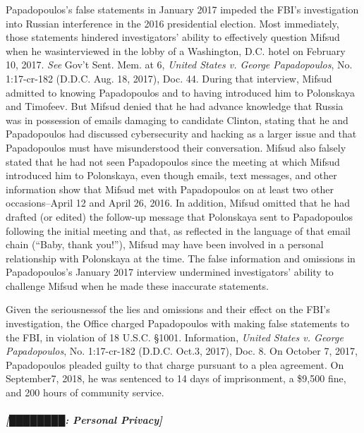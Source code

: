 Papadopoulos's false statements in January 2017 impeded the FBI's investigation into Russian interference in the 2016 presidential election. 
Most immediately, those statements hindered investigators' ability to effectively question Mifsud when he wasinterviewed in the lobby of a Washington, D.C. hotel on February 10, 2017. 
\textit{See} Gov't Sent. Mem. at 6, \textit{United States v. George Papadopoulos}, No. 1:17-cr-182 (D.D.C. Aug. 18, 2017), Doc. 44. 
During that interview, Mifsud admitted to knowing Papadopoulos and to having introduced him to Polonskaya and Timofeev. 
But Mifsud denied that he had advance knowledge that Russia was in possession of emails damaging to candidate Clinton, stating that he and Papadopoulos had discussed cybersecurity and hacking as a larger issue and that Papadopoulos must have misunderstood their conversation. 
Mifsud also falsely stated that he had not seen Papadopoulos since the meeting at which Mifsud introduced him to Polonskaya, even though emails, text messages, and other information show that Mifsud met with Papadopoulos on at least two other occasions--April 12 and April 26, 2016. 
In addition, Mifsud omitted that he had drafted (or edited) the follow-up message that Polonskaya sent to Papadopoulos following the initial meeting and that, as reflected in the language of that email chain (``Baby, thank you!''), Mifsud may have been involved in a personal relationship with Polonskaya at the time. 
The false information and omissions in Papadopoulos's January 2017 interview undermined investigators' ability to challenge Mifsud when he made these inaccurate statements.

Given the seriousnessof the lies and omissions and their effect on the FBI's investigation, the Office charged Papadopoulos with making false statements to the FBI, in violation of 18 U.S.C. \S 1001. 
Information, \textit{United States v. George Papadopoulos}, No. 1:17-cr-182 (D.D.C. Oct.3, 2017), Doc. 8. 
On October 7, 2017, Papadopoulos pleaded guilty to that charge pursuant to a plea agreement. 
On September7, 2018, he was sentenced to 14 days of imprisonment, a \$9,500 fine, and 200 hours of community service.

\subparagraph{[████████: Personal Privacy]}


